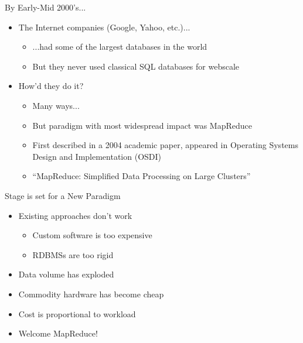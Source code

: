 \documentclass[aspectratio=169]{beamer}
\begin{document}
\begin{frame}{By Early-Mid 2000's...}

\begin{itemize}
\item The Internet companies (Google, Yahoo, etc.)...
        \begin{itemize}
        \item ...had some of the largest databases in the world
        \item But they never used classical SQL databases for webscale
        \end{itemize}
\item How'd they do it?
        \begin{itemize}
        \item Many ways...
	\item But paradigm with most widespread impact was MapReduce
	\item First described in a 2004 academic paper, appeared in Operating Systems Design and Implementation (OSDI)
	\item  ``MapReduce: Simplified Data Processing on Large Clusters''
        \end{itemize}
\end{itemize}
\end{frame}
\begin{frame}{Stage is set for a New Paradigm}

\begin{itemize}
\item Existing approaches don't work
\begin{itemize}
\item Custom software is too expensive
\item RDBMSs are too rigid
\end{itemize}
\item Data volume has exploded
\item Commodity hardware has become cheap
\item Cost is proportional to workload
\item Welcome MapReduce!
\end{itemize}
\end{frame}
%
\end{document}
